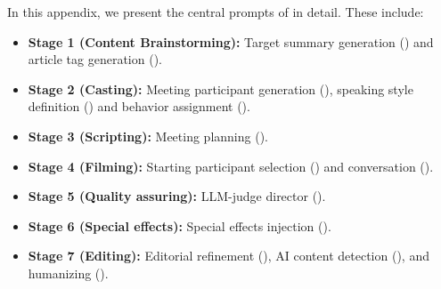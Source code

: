 In this appendix, we present the central prompts of \pipeline{} in detail.
These include:
\begin{itemize}[noitemsep, topsep=0pt, leftmargin=*]
    \item \textbf{Stage 1 (Content Brainstorming):} Target summary generation () and article tag generation ().  
    \item \textbf{Stage 2 (Casting):} Meeting participant generation (), speaking style definition () and behavior assignment ().
    \item \textbf{Stage 3 (Scripting):} Meeting planning ().
    \item \textbf{Stage 4 (Filming):} Starting participant selection () and conversation ().
    \item \textbf{Stage 5 (Quality assuring):} LLM-judge director ().
    \item \textbf{Stage 6 (Special effects):} Special effects injection ().
    \item \textbf{Stage 7 (Editing):} Editorial refinement (), AI content detection (), and humanizing ().
\end{itemize}


